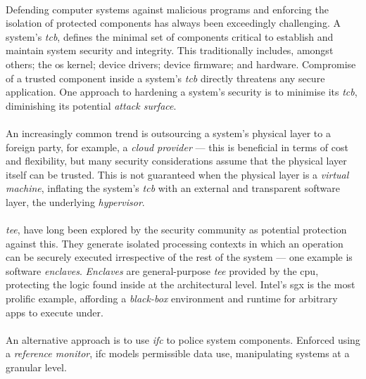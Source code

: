


\paragraph{} Defending computer systems against malicious programs and enforcing the isolation of protected components has always been exceedingly challenging. A system's \textit{\acrfull{tcb}}, defines the minimal set of components critical to establish and maintain system security and integrity. This traditionally includes, amongst others; the \acrshort{os} kernel; device drivers; device firmware; and hardware. Compromise of a trusted component inside a system's \textit{\acrshort{tcb}} directly threatens any secure application. One approach to hardening a system's security is to minimise its \textit{\acrshort{tcb}}, diminishing its potential \textit{attack surface}. 

\paragraph{} An increasingly common trend is outsourcing a system's physical layer to a foreign party, for example, a \textit{cloud provider} --- this is beneficial in terms of cost and flexibility, but many security considerations assume that the physical layer itself can be trusted. This is not guaranteed when the physical layer is a \textit{virtual machine}, inflating the system's \textit{\acrshort{tcb}} with an external and transparent software layer, the underlying \textit{hypervisor}.

\paragraph{} \textit{\acrfull{tee}}, have long been explored by the security community as potential protection against this. They generate isolated processing contexts in which an operation can be securely executed irrespective of the rest of the system --- one example is software \textit{enclaves}. \textit{Enclaves} are general-purpose \textit{\acrshort{tee}} provided by the \acrshort{cpu}, protecting the logic found inside at the architectural level. Intel's \acrfull{sgx} is the most prolific example, affording a \textit{black-box} environment and runtime for arbitrary apps to execute under.

\paragraph{} An alternative approach is to use \textit{\acrfull{ifc}} to police system components. Enforced using a \textit{reference monitor}, \acrshort{ifc} models permissible data use, manipulating systems at a granular level.

